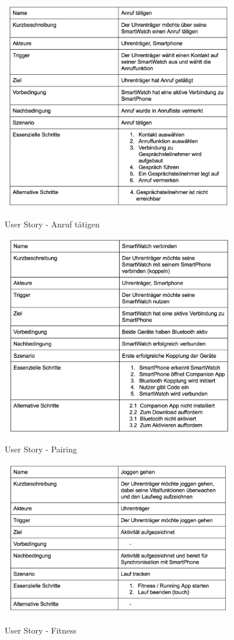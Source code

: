 \begin{figure}[H]
\centering\
\includegraphics[width=10cm]{img/story_out}
\caption{User Story - Anruf tätigen}\label{fig:story-out}
\end{figure}
\begin{figure}[H]
\centering\
\includegraphics[width=10cm]{img/story_pairing}
\caption{User Story - Pairing}\label{fig:story-pairing}
\end{figure}
\begin{figure}[H]
\centering\
\includegraphics[width=10cm]{img/story_joggen}
\caption{User Story - Fitness}\label{fig:story-joggen}
\end{figure}

